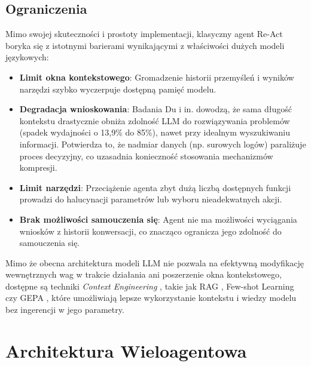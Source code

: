 \subsection{Ograniczenia}
Mimo swojej skuteczności i prostoty implementacji, klasyczny agent Re-Act boryka się z istotnymi barierami wynikającymi z właściwości dużych modeli językowych:
\begin{itemize}
       \item \textbf{Limit okna kontekstowego}: Gromadzenie historii przemyśleń i wyników narzędzi szybko wyczerpuje dostępną pamięć modelu.
       \item \textbf{Degradacja wnioskowania}: Badania Du i in. \cite{du2025context_length_hurts_llm} dowodzą, że sama długość kontekstu drastycznie obniża zdolność LLM do rozwiązywania problemów (spadek wydajności o 13,9\% do 85\%), nawet przy idealnym wyszukiwaniu informacji. Potwierdza to, że nadmiar danych (np. surowych logów) paraliżuje proces decyzyjny, co uzasadnia konieczność stosowania mechanizmów kompresji.
       \item \textbf{Limit narzędzi}: Przeciążenie agenta zbyt dużą liczbą dostępnych funkcji prowadzi do halucynacji parametrów lub wyboru nieadekwatnych akcji.
       \item \textbf{Brak możliwości samouczenia się}: Agent nie ma możliwości wyciągania wniosków z historii konwersacji, co znacząco ogranicza jego zdolność do samouczenia się. 
\end{itemize}

Mimo że obecna architektura modeli LLM nie pozwala na efektywną modyfikację wewnętrznych wag w trakcie działania ani poszerzenie okna kontekstowego, dostępne są techniki \textit{Context Engineering} \cite{mei2025context_engineering_survey}, takie jak RAG \cite{lewis2020rag}, Few-shot Learning \cite{brown2020gpt3} czy GEPA \cite{agrawal2025gepa}, które umożliwiają lepsze wykorzystanie kontekstu i wiedzy modelu bez ingerencji w jego parametry.

\section{Architektura Wieloagentowa}
